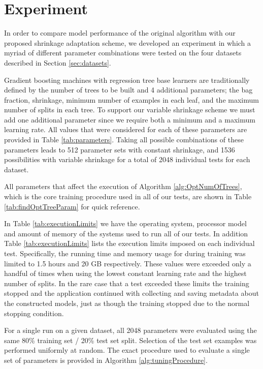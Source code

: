 \documentclass[9pt, conference]{IEEEtran}
\begin{document}
\section {Experiment}
In order to compare model performance of the original algorithm with our proposed shrinkage adaptation scheme, we developed an experiment in which a myriad of different parameter combinations were tested on the four datasets described in Section \ref{sec:datasets}. 

Gradient boosting machines with regression tree base learners are traditionally defined by the number of trees to be built and 4 additional parameters; the bag fraction, shrinkage, minimum number of examples in each leaf, and the maximum number of splits in each tree. To support our variable shrinkage scheme we must add one additional parameter since we require both a minimum and a maximum learning rate. All values that were considered for each of these parameters are provided in Table \ref{tab:parameters}. Taking all possible combinations of these parameters leads to 512 parameter sets with constant shrinkage, and 1536 possibilities with variable shrinkage for a total of 2048 individual tests for each dataset. 

All parameters that affect the execution of Algorithm \ref{alg:OptNumOfTrees}, which is the core training procedure used in all of our tests, are shown in Table \ref{tab:findOptTreeParam} for quick reference. 

In Table \ref{tab:executionLimits} we have the operating system, processor model and amount of memory of the systems used to run all of our tests. In addition Table  \ref{tab:executionLimits} lists the execution limits imposed on each individual test. Specifically, the running time and memory usage for during training was limited to 1.5 hours and 20 GB respectively. These values were exceeded only a handful of times when using the lowest constant learning rate and the highest number of splits. In the rare case that a test exceeded these limits the training stopped and the application continued with collecting and saving metadata about the constructed models, just as though the training stopped due to the normal stopping condition.

For a single run on a given dataset, all 2048 parameters were evaluated using the same 80\% training set / 20\% test set split. Selection of the test set examples was performed uniformly at random. The exact procedure used to evaluate a single set of parameters is provided in Algorithm \ref{alg:tuningProcedure}.
\end{document}

